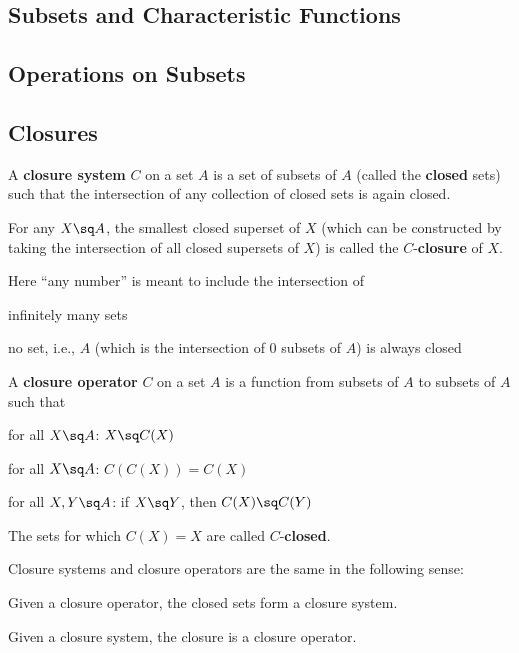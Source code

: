 \subsection{Subsets and Characteristic Functions}

\subsection{Operations on Subsets}

\subsection{Closures}

\begin{definition}\label{def:math:clossys}
A \textbf{closure system} $C$ on a set $A$ is a set of subsets of $A$ (called the \textbf{closed} sets) such that the intersection of any collection of closed sets is again closed.

For any $X\sq A$, the smallest closed superset of $X$ (which can be constructed by taking the intersection of all closed supersets of $X$) is called the $C$-\textbf{closure} of $X$.
\end{definition}

Here ``any number'' is meant to include the intersection of
\begin{compactitem}
 \item infinitely many sets
 \item no set, i.e., $A$ (which is the intersection of $0$ subsets of $A$) is always closed
\end{compactitem}

\begin{definition}\label{def:math:closop}
A \textbf{closure operator} $C$ on a set $A$ is a function from subsets of $A$ to subsets of $A$ such that
\begin{compactitem}
 \item for all $X\sq A$: $X\sq C(X)$
 \item for all $X\sq A$: $C(C(X))= C(X)$
 \item for all $X,Y\sq A$: if $X\sq Y$, then $C(X)\sq C(Y)$
\end{compactitem}

The sets for which $C(X)=X$ are called $C$-\textbf{closed}.
\end{definition}

\begin{theorem}[Closure]\label{thm:math:clos}
Closure systems and closure operators are the same in the following sense:
\begin{compactitem}
 \item Given a closure operator, the closed sets form a closure system.
 \item Given a closure system, the closure is a closure operator.
\end{compactitem}
\end{theorem}

